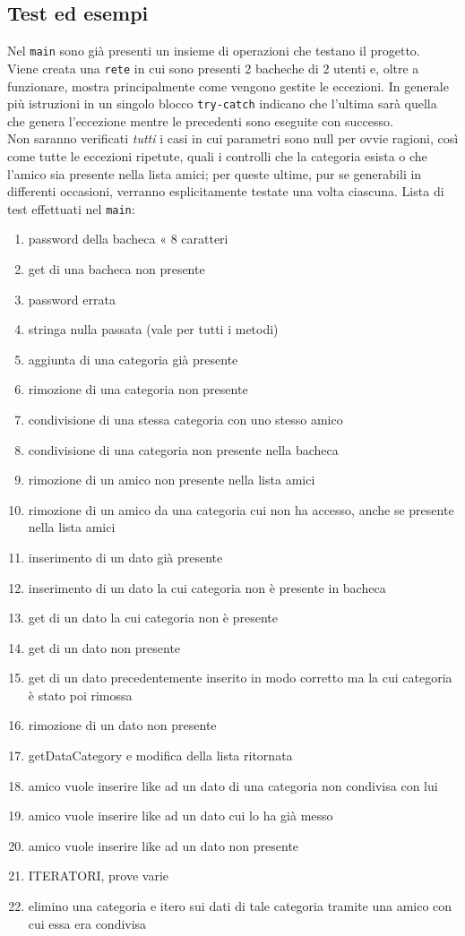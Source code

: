 \documentclass[10pt, a4paper]{article}
\begin{document}
\subsection{Test ed esempi}
Nel \texttt{main} sono già presenti un insieme di operazioni che testano il progetto. \\
Viene creata una \texttt{rete} in cui sono presenti 2 bacheche di 2 utenti e, oltre a funzionare, mostra principalmente come vengono gestite le eccezioni. In generale più istruzioni in un singolo blocco \texttt{try-catch} indicano che l'ultima sarà quella che genera l'eccezione mentre le precedenti sono eseguite con successo.\\
Non saranno verificati \textit{tutti} i casi in cui parametri sono null per ovvie ragioni, così come tutte le eccezioni ripetute, quali i controlli che la categoria esista o che l'amico sia presente nella lista amici; per queste ultime, pur se generabili in differenti occasioni, verranno esplicitamente testate una volta ciascuna. 
Lista di test effettuati nel \texttt{main}:
\begin{enumerate}
\item password della bacheca « 8 caratteri
\item get di una bacheca non presente
\item password errata
\item stringa nulla passata (vale per tutti i metodi)
\item aggiunta di una categoria già presente
\item rimozione di una categoria non presente
\item condivisione di una stessa categoria con uno stesso amico
\item condivisione di una categoria non presente nella bacheca
\item rimozione di un amico non presente nella lista amici
\item rimozione di un amico da una categoria cui non ha accesso, anche se presente nella lista amici
\item inserimento di un dato già presente
\item inserimento di un dato la cui categoria non è presente in bacheca
\item get di un dato la cui categoria non è presente
\item get di un dato non presente
\item get di un dato precedentemente inserito in modo corretto ma la cui categoria è stato poi rimossa
\item rimozione di un dato non presente
\item getDataCategory e modifica della lista ritornata
\item amico vuole inserire like ad un dato di una categoria non condivisa con lui
\item amico vuole inserire like ad un dato cui lo ha già messo
\item amico vuole inserire like ad un dato non presente
\item ITERATORI, prove varie
\item elimino una categoria e itero sui dati di tale categoria tramite una amico con cui essa era condivisa
\end{enumerate}
\end{document}
